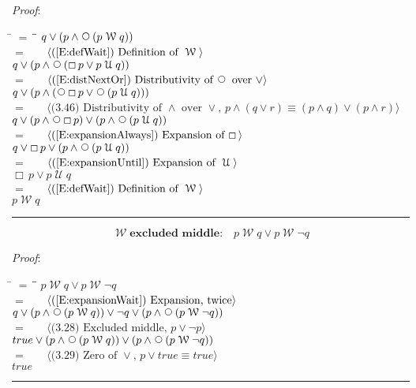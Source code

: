 \documentclass[12pt, fleqn, leqno]{article}
\newcommand{\lgap}{2pt}                             %
\newcommand{\mymathindent}{24pt}                    %
\newcommand{\Until}{\;\mathcal{U}\;}
\newcommand{\Wait}{\;\mathcal{W}\;}
\newcommand{\Next}{\;\,\text{\raisebox{3.5pt}{\circle{6}}}}
\newcommand{\Always}{\Box\,}
\newcommand{\myqed}{\rule[-.23ex]{1.2ex}{2.0ex}}
\newcommand{\myqedtab}{\hspace{384pt}}              %
\newcommand{\Gll} {\langle}                         %
\newcommand{\Ggg} {\rangle}                         %
\newcommand{\Hint}[1]     {\ \ \ $\Gll              \mbox{#1} \Ggg$ }   %
\begin{document}
\emph{Proof}:
\begin{tabbing}
\hspace{\mymathindent} \= $= \;$ \= \myqedtab \= \kill
\> \> $q \lor (p \land \Next (p \Wait q))$\\[\lgap]
\> $=$ \> \Hint{(\ref{E:defWait}) Definition of $\Wait$} \\[\lgap]
\> \> $q \lor (p \land \Next (\Always p\lor p \Until q))$\\[\lgap]
\> $=$ \> \Hint{(\ref{E:distNextOr}) Distributivity of $\Next$ over $\lor$} \\[\lgap]
\> \> $q \lor (p \land (\Next\Always p\lor \Next (p \Until q)))$\\[\lgap]
\> $=$ \> \Hint{(3.46) Distributivity of $\land$ over $\lor$, $p\land (q\lor r)\equiv (p\land q)\lor (p\land r)$}\\[\lgap]
\> \> $q \lor (p \land \Next\Always p)\lor (p \land \Next(p \Until q))$\\[\lgap]
\> $=$ \> \Hint{(\ref{E:expansionAlways}) Expansion of $\Always$}\\[\lgap]
\> \> $q \lor \Always p\lor (p \land \Next(p \Until q))$\\[\lgap]
\> $=$ \> \Hint{(\ref{E:expansionUntil}) Expansion of $\Until$}\\[\lgap]
\> \> $\Always p\lor p \Until q$\\[\lgap]
\> $=$ \> \Hint{(\ref{E:defWait}) Definition of $\Wait$} \\[\lgap]
\> \> $p \Wait q$ \quad \myqed
\end{tabbing}
\begin{equation}\label{E:waitExcludedMiddle}
\Wait \textbf{excluded middle:}\quad p \Wait q \lor p\Wait \neg q
\end{equation}

\emph{Proof}:
\begin{tabbing}
\hspace{\mymathindent} \= $= \;$ \= \myqedtab \= \kill
\> \> $p \Wait q \lor p\Wait \neg q$\\[\lgap]
\> $=$ \> \Hint{(\ref{E:expansionWait}) Expansion, twice} \\[\lgap]
\> \> $q\lor (p\land \Next (p\Wait q))\lor \neg q \lor (p\land \Next (p\Wait \neg q))$\\[\lgap]
\> $=$ \> \Hint{(3.28) Excluded middle, $p\lor \neg p$} \\[\lgap]
\> \> $true \lor (p\land \Next (p\Wait q)) \lor (p\land \Next (p\Wait \neg q))$\\[\lgap]
\> $=$ \> \Hint{(3.29) Zero of $\lor$, $p\lor true\equiv true$} \\[\lgap]
\> \> $true$ \quad \myqed
\end{tabbing}
\end{document}
